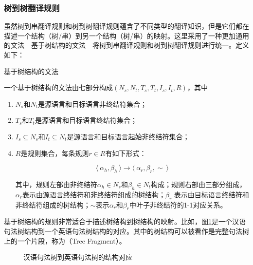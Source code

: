 
\subsubsection{树到树翻译规则}

\parinterval 虽然树到串翻译规则和树到树翻译规则蕴含了不同类型的翻译知识，但是它们都在描述一个结构（树/串）到另一个结构（树/串）的映射。这里采用了一种更加通用的文法\ \dash \ 基于树结构的文法\ \dash \ 将树到串翻译规则和树到树翻译规则进行统一。定义如下：

\vspace{0.5em}
\begin{definition} 基于树结构的文法

{\small
一个基于树结构的文法由七部分构成$(N_s, N_t, T_s, T_t, I_s, I_t, R)$，其中
\begin{enumerate}
\item $N_s$和$N_t$是源语言和目标语言非终结符集合；
\item $T_s$和$T_t$是源语言和目标语言终结符集合；
\item $I_s \subseteq N_s$和$I_t \subseteq N_t$是源语言和目标语言起始非终结符集合；
\item $R$是规则集合，每条规则$r \in R$有如下形式：

\begin{displaymath}
\langle\  \alpha_h, \beta_h\ \rangle \to \langle\ \alpha_r, \beta_r, \sim\ \rangle
\end{displaymath}

其中，规则左部由非终结符$\alpha_h \in N_s$和$\beta_h \in N_t$构成；规则右部由三部分组成，$\alpha_r$表示由源语言终结符和非终结符组成的树结构；$\beta_r$ 表示由目标语言终结符和非终结符组成的树结构；$\sim$表示$\alpha_r$和$\beta_r$中叶子非终结符的1-1对应关系。
\end{enumerate}
}
\end{definition}

\parinterval 基于树结构的规则非常适合于描述树结构到树结构的映射。比如，图\ref{fig:4-46}是一个汉语句法树结构到一个英语句法树结构的对应。其中的树结构可以被看作是完整句法树上的一个片段，称为{\small{}}（Tree Fragment）。

\begin{figure}[htp]
\centering

\vspace{-2em}
\caption{汉语句法树到英语句法树的结构对应}
\label{fig:4-46}
\end{figure}

